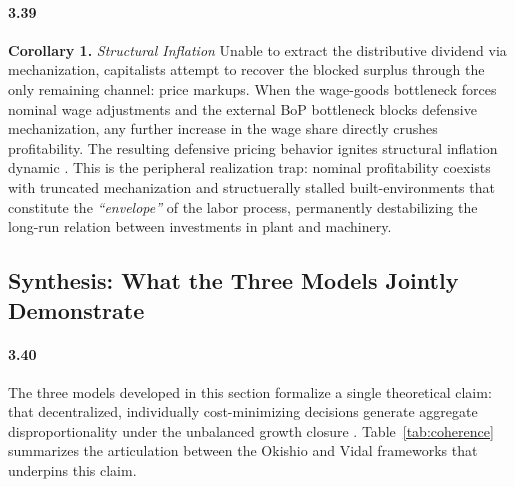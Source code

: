 \paragraph{3.39}

\textbf{Corollary 1.} \textit{Structural Inflation} Unable to extract the distributive dividend via mechanization, capitalists attempt to recover the blocked surplus through the only remaining channel: price markups. When the wage-goods bottleneck forces nominal wage adjustments and the external BoP
bottleneck blocks defensive mechanization, any further increase
in the wage share directly crushes profitability. The resulting
defensive pricing behavior ignites structural inflation
dynamic \citep{Kalecki1955, Sunkel1958, Prebisch1981}. This is the
peripheral realization trap: nominal profitability coexists
with truncated mechanization and structuerally stalled built-environments that constitute the \textit{``envelope''} of the labor process,
permanently destabilizing the long-run relation between investments in plant 
and machinery.


\subsection{Synthesis: What the Three Models Jointly
	Demonstrate}

\paragraph{3.40}
The three models developed in this section formalize a single
theoretical claim: that decentralized, individually
cost-minimizing decisions generate aggregate
disproportionality under the unbalanced growth closure
\citep{Okishio1961, Basu2026}.
Table~\ref{tab:coherence} summarizes the articulation
between the Okishio and Vidal frameworks that underpins
this claim.

